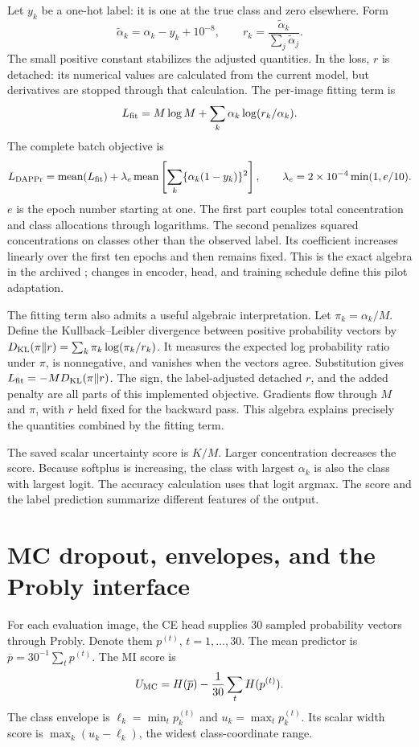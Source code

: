 \documentclass[11pt,a4paper]{report}
\newcommand{\code}[1]{\texttt{\detokenize{#1}}}
\begin{document}
Let $y_k$ be a one-hot label: it is one at the true class and zero elsewhere. Form
\begin{equation}
\widetilde\alpha_k=\alpha_k-y_k+10^{-8},\qquad
r_k=\frac{\widetilde\alpha_k}{\sum_j\widetilde\alpha_j}.
\end{equation}
The small positive constant stabilizes the adjusted quantities. In the loss, $r$ is detached: its numerical values are calculated from the current model, but derivatives are stopped through that calculation. The per-image fitting term is
\begin{equation}
L_{\rm fit}=M\log M+\sum_k\alpha_k\log(r_k/\alpha_k).
\end{equation}
The complete batch objective is
\begin{equation}
L_{\rm DAPPr}=\operatorname{mean}(L_{\rm fit})
+\lambda_e\operatorname{mean}\left[\sum_k\{\alpha_k(1-y_k)\}^2\right],
\qquad \lambda_e=2\times10^{-4}\min(1,e/10).
\end{equation}
$e$ is the epoch number starting at one. The first part couples total concentration and class allocations through logarithms. The second penalizes squared concentrations on classes other than the observed label. Its coefficient increases linearly over the first ten epochs and then remains fixed. This is the exact algebra in the archived \code{dappr_loss}; changes in encoder, head, and training schedule define this pilot adaptation.

The fitting term also admits a useful algebraic interpretation. Let $\pi_k=\alpha_k/M$. Define the Kullback--Leibler divergence between positive probability vectors by $D_{\rm KL}(\pi\Vert r)=\sum_k\pi_k\log(\pi_k/r_k)$. It measures the expected log probability ratio under $\pi$, is nonnegative, and vanishes when the vectors agree. Substitution gives $L_{\rm fit}=-M D_{\rm KL}(\pi\Vert r)$. The sign, the label-adjusted detached $r$, and the added penalty are all parts of this implemented objective. Gradients flow through $M$ and $\pi$, with $r$ held fixed for the backward pass. This algebra explains precisely the quantities combined by the fitting term.

The saved scalar uncertainty score is $K/M$. Larger concentration decreases the score. Because softplus is increasing, the class with largest $\alpha_k$ is also the class with largest logit. The accuracy calculation uses that logit argmax. The score and the label prediction summarize different features of the output.

\section{MC dropout, envelopes, and the Probly interface}
For each evaluation image, the CE head supplies 30 sampled probability vectors through Probly. Denote them $p^{(t)}$, $t=1,\ldots,30$. The mean predictor is $\overline p=30^{-1}\sum_tp^{(t)}$. The MI score is
\begin{equation}
U_{\rm MC}=H(\overline p)-\frac1{30}\sum_tH(p^{(t)}).
\end{equation}
The class envelope is $\ell_k=\min_tp_k^{(t)}$ and $u_k=\max_tp_k^{(t)}$. Its scalar width score is $\max_k(u_k-\ell_k)$, the widest class-coordinate range.
\end{document}
